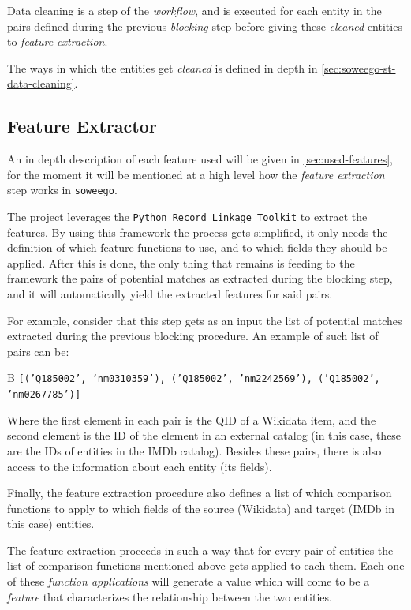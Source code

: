 \documentclass[epsfig,a4paper,11pt,titlepage,twoside,openany]{book}
\begin{document}
Data cleaning is a step of the \textit{workflow}, and is executed for each entity in the pairs defined during the previous \textit{blocking} step before giving these \textit{cleaned} entities to \textit{feature extraction}. 

The ways in which the entities get \textit{cleaned} is defined in depth in \autoref{sec:soweego-st-data-cleaning}. 


\subsection{Feature Extractor}
\label{sec:soweego-st-feature-ext}

An in depth description of each feature used will be given in \autoref{sec:used-features}, for the moment it will be mentioned at a high level how the \textit{feature extraction} step works in \texttt{soweego}. 

The project leverages the \texttt{Python Record Linkage Toolkit} \cite{recordlinkage-library} to extract the features. By using this framework the process gets simplified, it only needs the definition of which feature functions to use, and to which fields they should be applied. 
After this is done, the only thing that remains is feeding to the framework the pairs of potential matches as extracted during the blocking step, and it will automatically yield the extracted features for said pairs.

For example, consider that this step gets as an input the list of potential matches extracted during the previous blocking procedure. An example of such list of pairs can be: 

\begin{center}B
    \texttt{[('Q185002', 'nm0310359'), ('Q185002', 'nm2242569'), ('Q185002', 'nm0267785')]}
\end{center}

Where the first element in each pair is the QID of a Wikidata item, and the second element is the ID of the element in an external catalog (in this case, these are the IDs of entities in the IMDb catalog). Besides these pairs, there is also access to the information about each entity (its fields). 

Finally, the feature extraction procedure also defines a list of which comparison functions to apply to which fields of the source (Wikidata) and target (IMDb in this case) entities.

The feature extraction proceeds in such a way that for every pair of entities the list of comparison functions mentioned above gets applied to each them. Each one of these \textit{function applications} will generate a value which will come to be a \textit{feature} that characterizes the relationship between the two entities.
\end{document}
